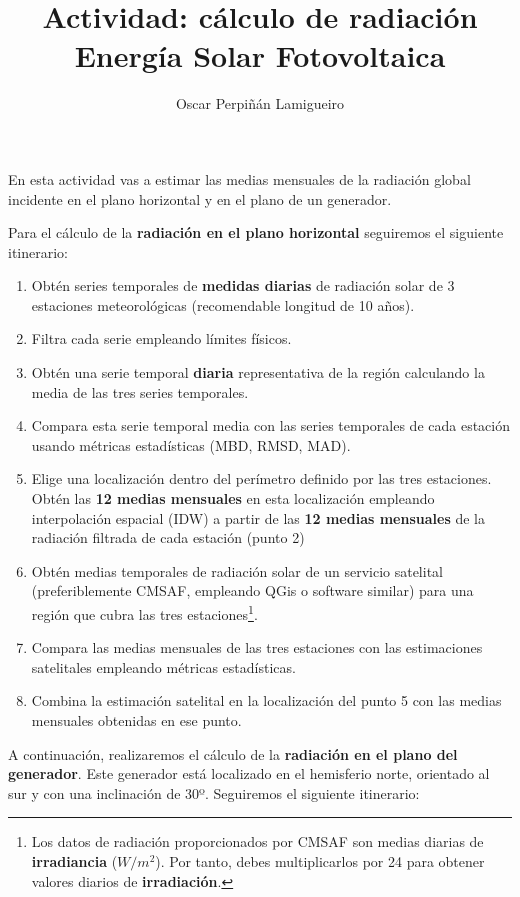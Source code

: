 \documentclass[11pt]{article}
\author{Oscar Perpiñán Lamigueiro}
\date{}
\title{Actividad: cálculo de radiación\\\medskip
\large Energía Solar Fotovoltaica}
\begin{document}
\maketitle
En esta actividad vas a estimar las medias mensuales de la radiación global incidente en el plano horizontal y en el plano de un generador.

Para el cálculo de la \textbf{radiación en el plano horizontal} seguiremos el siguiente itinerario:

\begin{enumerate}
\item Obtén series temporales de \textbf{medidas diarias} de radiación solar de 3 estaciones meteorológicas (recomendable longitud de 10 años).
\item Filtra cada serie empleando límites físicos.
\item Obtén una serie temporal \textbf{diaria} representativa de la región calculando la media de las tres series temporales.
\item Compara esta serie temporal media con las series temporales de cada estación usando métricas estadísticas (MBD, RMSD, MAD).
\item Elige una localización dentro del perímetro definido por las tres estaciones. Obtén las \textbf{12 medias mensuales} en esta localización empleando interpolación espacial (IDW) a partir de las \textbf{12 medias mensuales} de la radiación filtrada de cada estación (punto 2)
\item Obtén medias temporales de radiación solar de un servicio satelital (preferiblemente CMSAF,  empleando QGis o software similar) para una región que cubra las tres estaciones\footnote{Los datos de radiación proporcionados por CMSAF son medias diarias de \textbf{irradiancia} (\(W/m^2\)). Por tanto, debes multiplicarlos por 24 para obtener valores diarios de \textbf{irradiación}.}.
\item Compara las medias mensuales de las tres estaciones con las estimaciones satelitales empleando métricas estadísticas.
\item Combina la estimación satelital en la localización del punto 5 con las medias mensuales obtenidas en ese punto.
\end{enumerate}

A continuación, realizaremos el cálculo de la \textbf{radiación en el plano del generador}. Este generador está localizado en el hemisferio norte, orientado al sur y con una inclinación de 30º. Seguiremos el siguiente itinerario:
\end{document}
